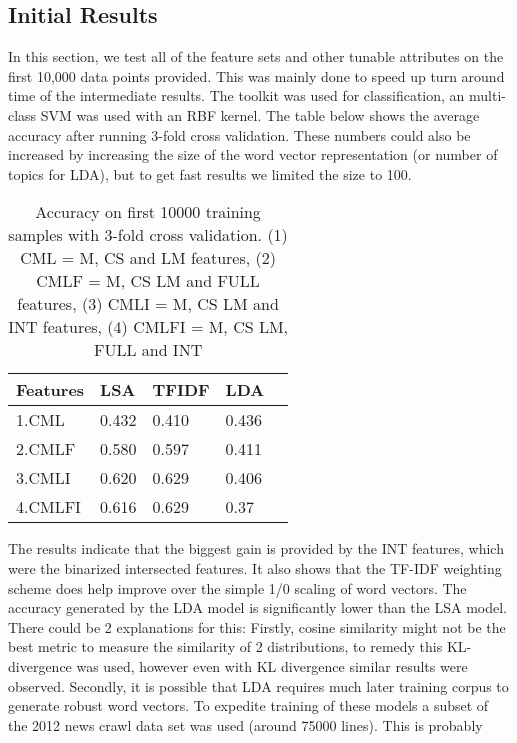 \documentclass[11pt]{article}
\begin{document}
\subsection{Initial Results}
In this section, we test all of the feature sets and other tunable attributes on
the first 10,000 data points provided. This was mainly done to speed up turn
around time of the intermediate results. The \cite{scikit-learn} toolkit was used for
classification, an multi-class SVM was used with an RBF kernel. The table below shows the average accuracy after running 3-fold cross validation. These numbers could also be increased by increasing the size of the word vector representation (or number of topics for LDA), but to get fast results we limited the size to 100.
\begin{table}[h]
\begin{center}
\begin{singlespace}
\begin{tabular}{|l|l|l|l|l|}
\hline \bf Features & \bf LSA & \bf TFIDF  & \bf LDA \\ \hline
1.CML &0.432& 0.410 & 0.436\\
2.CMLF &0.580 & 0.597&0.411\\
3.CMLI & 0.620 & 0.629&0.406\\
4.CMLFI&0.616& 0.629&0.37 \\
\hline
\end{tabular}
\end{singlespace}
\end{center}
\caption{ Accuracy on first 10000 training samples with 3-fold cross validation.
  (1) CML = M, CS and LM features, 
  (2) CMLF = M, CS LM and FULL features,
  (3) CMLI = M, CS LM and INT features,
  (4) CMLFI = M, CS LM, FULL and INT}
\end{table}
The results indicate that the biggest gain is provided by the INT features,
which were the binarized intersected features. It also shows that the TF-IDF
weighting scheme does help improve over the simple 1/0 scaling of word vectors.
The accuracy generated by the LDA model is significantly lower than the LSA
model. There could be 2 explanations for this: Firstly, cosine similarity might
not be the best metric to measure the similarity of 2 distributions, to remedy this
KL-divergence was used, however even with KL divergence similar results were
observed. Secondly, it is possible that LDA requires much later training corpus
to generate robust word vectors. To expedite training of these models a subset
of the 2012 news crawl data set was used (around 75000 lines). This is probably
\end{document}
